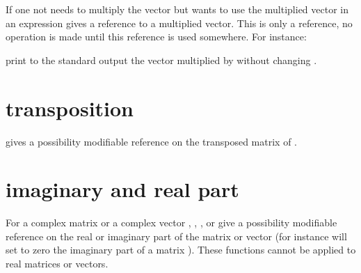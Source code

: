 \documentclass[a4paper,11pt,english]{sphinxmanual}
\begin{document}
\begin{sphinxVerbatim}[commandchars=\\\{\}]
   
\end{sphinxVerbatim}

If one not needs to multiply the vector but wants to use the multiplied vector in an expression   gives a reference to a multiplied vector. This is only a reference, no operation is made until this reference is used somewhere. For instance:

\begin{sphinxVerbatim}[commandchars=\\\{\}]
     
\end{sphinxVerbatim}

print to the standard output the vector  multiplied by  without changing .


\section{transposition}
\label{\detokenize{gmm/blas:transposition}}
 gives a possibility modifiable reference on the transposed matrix of .


\section{imaginary and real part}
\label{\detokenize{gmm/blas:imaginary-and-real-part}}
For a complex matrix  or a complex vector ,
, ,  or  give a possibility modifiable reference on the real or imaginary part of the matrix or vector (for instance  will set to zero the imaginary part of a matrix ). These functions cannot be applied to real matrices or vectors.
\end{document}

